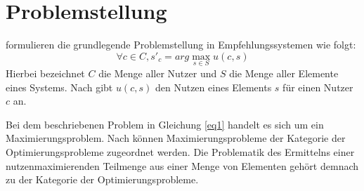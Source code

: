 \section{Problemstellung}
\label{ch:empfehlungssysteme:problemstellung}
\textcite[S. 735]{adomavicius:inproceedings} formulieren die grundlegende Problemstellung in Empfehlungssystemen wie folgt:
\begin{equation}\label{eq1}
    \forall c \in C, s'_c = arg\max_{s \in S} u(c,s)
\end{equation}
Hierbei bezeichnet $C$ die Menge aller Nutzer und $S$ die Menge aller Elemente eines Systems.
Nach \textcite[S. 735]{adomavicius:inproceedings} gibt $u(c,s)$ den Nutzen eines Elements $s$ für einen Nutzer $c$ an.

Bei dem beschriebenen Problem in Gleichung \ref{eq1} handelt es sich um ein Maximierungsproblem.
Nach \textcite[S. 1]{book:kallrath} können Maximierungsprobleme der Kategorie der Optimierungsprobleme zugeordnet werden.
Die Problematik des Ermittelns einer nutzenmaximierenden Teilmenge aus einer Menge von Elementen gehört demnach zu der Kategorie der Optimierungsprobleme.

